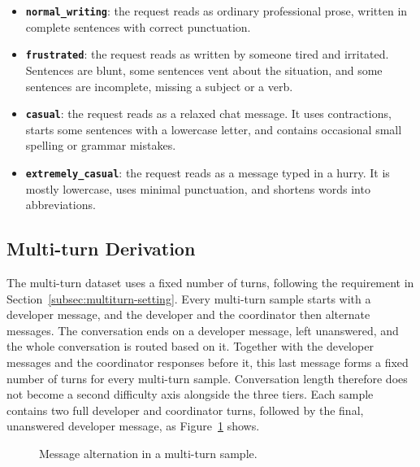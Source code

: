 \begin{itemize}
    \item \textbf{\texttt{normal\_writing}}: the request reads as ordinary professional prose, written in complete sentences with correct punctuation.
    \item \textbf{\texttt{frustrated}}: the request reads as written by someone tired and irritated. Sentences are blunt, some sentences vent about the situation, and some sentences are incomplete, missing a subject or a verb.
    \item \textbf{\texttt{casual}}: the request reads as a relaxed chat message. It uses contractions, starts some sentences with a lowercase letter, and contains occasional small spelling or grammar mistakes.
    \item \textbf{\texttt{extremely\_casual}}: the request reads as a message typed in a hurry. It is mostly lowercase, uses minimal punctuation, and shortens words into abbreviations.
\end{itemize}

\subsection{Multi-turn Derivation}
\label{subsec:multiturn-derivation}

The multi-turn dataset uses a fixed number of turns, following the requirement in Section~\ref{subsec:multiturn-setting}. Every multi-turn sample starts with a developer message, and the developer and the coordinator then alternate messages. The conversation ends on a developer message, left unanswered, and the whole conversation is routed based on it. Together with the developer messages and the coordinator responses before it, this last message forms a fixed number of turns for every multi-turn sample. Conversation length therefore does not become a second difficulty axis alongside the three tiers. Each sample contains two full developer and coordinator turns, followed by the final, unanswered developer message, as Figure~\ref{fig:multiturn-alternation} shows.

\begin{figure}[H]
    \centering
    \caption[Message alternation in a multi-turn sample]{Message alternation in a multi-turn sample.}
    \label{fig:multiturn-alternation}
\end{figure}

